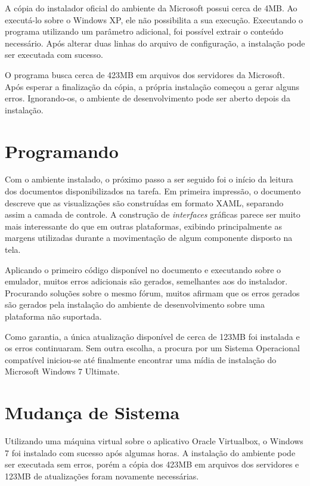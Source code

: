 \documentclass{article}
\begin{document}
A cópia do instalador oficial do ambiente da Microsoft possui cerca de 4MB. Ao
executá-lo sobre o Windows XP, ele não possibilita a sua execução. Executando o
programa utilizando um parâmetro adicional, foi possível extrair o conteúdo
necessário. Após alterar duas linhas do arquivo de configuração, a instalação
pode ser executada com sucesso.

O programa busca cerca de 423MB em arquivos dos servidores da Microsoft. Após
esperar a finalização da cópia, a própria instalação começou a gerar alguns
erros. Ignorando-os, o ambiente de desenvolvimento pode ser aberto depois da
instalação.

\section{Programando}
\label{sec:programando}

Com o ambiente instalado, o próximo passo a ser seguido foi o início da leitura
dos documentos disponibilizados na tarefa. Em primeira impressão, o documento
descreve que as visualizações são construídas em formato XAML, separando assim a
camada de controle. A construção de \textit{interfaces} gráficas parece ser
muito mais interessante do que em outras plataformas, exibindo principalmente as
margens utilizadas durante a movimentação de algum componente disposto na tela.

Aplicando o primeiro código disponível no documento e executando sobre o
emulador, muitos erros adicionais são gerados, semelhantes aos do instalador.
Procurando soluções sobre o mesmo fórum, muitos afirmam que os erros gerados são
gerados pela instalação do ambiente de desenvolvimento sobre uma plataforma não
suportada.

Como garantia, a única atualização disponível de cerca de 123MB foi instalada e
os erros continuaram. Sem outra escolha, a procura por um Sistema Operacional
compatível iniciou-se até finalmente encontrar uma mídia de instalação do
Microsoft Windows 7 Ultimate.

\section{Mudança de Sistema}
\label{sec:sistema}

Utilizando uma máquina virtual sobre o aplicativo Oracle Virtualbox, o Windows 7
foi instalado com sucesso após algumas horas. A instalação do ambiente pode ser
executada sem erros, porém a cópia dos 423MB em arquivos dos servidores e
123MB de atualizações foram novamente necessárias.
\end{document}
